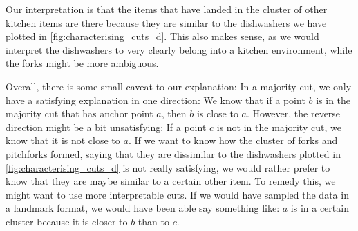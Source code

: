 Our interpretation is that the items that have landed in the cluster of other kitchen items are there because they are similar to
the dishwashers we have plotted in \autoref{fig:characterising_cuts_d}. This also makes sense, as we would interpret the dishwashers to very clearly belong into a kitchen environment, while the forks might be more ambiguous.

Overall, there is some small caveat to our explanation: In a majority cut, we only have a satisfying explanation in one direction: We know that if a point $b$ is in the majority cut that has anchor point $a$, 
then $b$ is close to $a$. However, the reverse direction might be a bit unsatisfying: If a point $c$ is not in the majority cut, we know that it is not close to $a$. If we want to know how the cluster
of forks and pitchforks formed, saying that they are dissimilar to the dishwashers plotted in \autoref{fig:characterising_cuts_d} is not really satisfying, we would rather prefer to know that they are maybe
similar to a certain other item. To remedy this, we might want to use more interpretable cuts. If we would have sampled the data in a landmark format, we would have been able say something like: $a$ is in a certain cluster
because it is closer to $b$ than to $c$.


